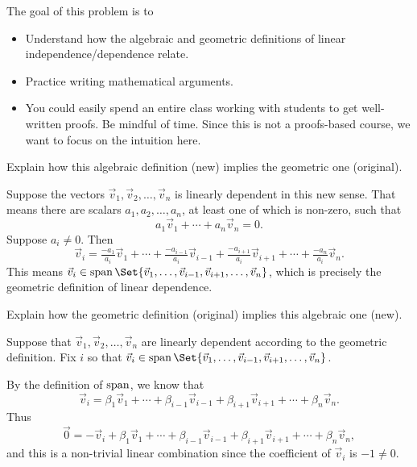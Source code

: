 	\question
	\begin{annotation}
		\begin{goals}

			The goal of this problem is to
			\begin{itemize}
				\item Understand how the algebraic and geometric definitions of linear
					independence/dependence relate.
				\item Practice writing mathematical arguments.
			\end{itemize}
		\end{goals}

		\begin{notes}
			\begin{itemize}
				\item You could easily spend an entire class working with students
					to get well-written proofs. Be mindful of time. Since
					this is not a proofs-based course, we want to focus on the intuition here.
			\end{itemize}
		\end{notes}
	\end{annotation}
	\begin{parts}
		\item Explain how this algebraic definition (new) implies the geometric one (original).
			\begin{solution}
				Suppose the vectors $\vec v_1, \vec v_2, \dots, \vec v_n$ is
				linearly dependent in this new sense. That means there are
				scalars	$a_1, a_2, \dots, a_n$, at least one of which is non-zero,
				such that
				\[
					a_1 \vec v_1 + \cdots + a_n \vec v_n = 0.
				\]
				Suppose $a_i\neq 0$. Then
				\[
					\vec v_i = \tfrac{-a_1}{a_i}\vec v_1+\cdots +\tfrac{-a_{i-1}}{a_i}\vec v_{i-1}
					+\tfrac{-a_{i+1}}{a_i}\vec v_{i+1}+\cdots+\tfrac{-a_n}{a_i}\vec v_n.
				\]
				This means $\vec v_i\in \Span\Set{\vec v_1,\ldots,\vec v_{i-1},\vec v_{i+1},\ldots,\vec v_n}$,
				which is precisely the geometric definition of linear dependence.
			\end{solution}
		\item Explain how the geometric definition (original) implies this algebraic one (new).
			\begin{solution}
				Suppose that $\vec v_1, \vec v_2, \dots, \vec v_n$ are linearly
				dependent according to the geometric definition. Fix $i$ so that
				$\vec v_i\in \Span\Set{\vec v_1,\ldots,\vec v_{i-1},\vec v_{i+1},\ldots,\vec v_n}$.

				By the definition of $\operatorname{span}$, we know that
				\[
					\vec v_i=\beta_1\vec v_1+\cdots +\beta_{i-1}\vec v_{i-1}+\beta_{i+1}\vec v_{i+1}
					+\cdots +\beta_n\vec v_{n}.
				\]
				Thus
				\[
					\vec 0 = -\vec v_i+\beta_1\vec v_1+\cdots +\beta_{i-1}\vec v_{i-1}+\beta_{i+1}\vec v_{i+1}
					+\cdots +\beta_n\vec v_{n},
				\]
				and this is a non-trivial linear combination since the coefficient of $\vec v_i$ is $-1\neq 0$.
			\end{solution}
	\end{parts}

